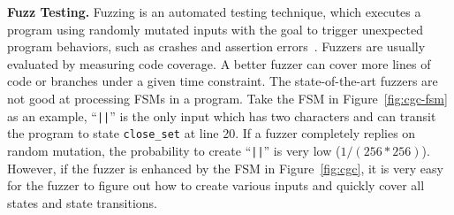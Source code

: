 \noindent\textbf{Fuzz Testing.}
Fuzzing is an automated testing technique, 
which executes a program
using randomly mutated inputs 
with the goal to trigger unexpected program behaviors,
such as crashes and assertion errors~\cite{afl,Angora,youwei-1}. 
Fuzzers are usually evaluated by measuring code coverage. 
A better fuzzer can cover more lines of code 
or branches under a given time constraint.
The state-of-the-art fuzzers are not good at processing 
FSMs in a program.
Take the FSM in Figure~\ref{fig:cgc-fsm} as an example, 
``\verb/||/'' is the only input which has two characters and 
can transit the program to state \texttt{close\_set} at line 20.
If a fuzzer completely replies on random mutation, the probability to 
create ``\verb/||/'' is very low ($1/(256 * 256)$). 
However, if the fuzzer is enhanced by the 
FSM in Figure~\ref{fig:cgc}, 
it is very easy for the fuzzer to figure out how to create various inputs and quickly cover 
all states and state transitions.  






